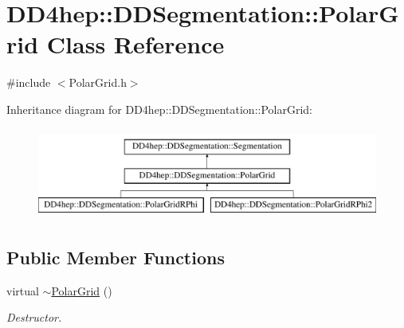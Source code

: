\hypertarget{class_d_d4hep_1_1_d_d_segmentation_1_1_polar_grid}{}\section{D\+D4hep\+:\+:D\+D\+Segmentation\+:\+:Polar\+Grid Class Reference}
\label{class_d_d4hep_1_1_d_d_segmentation_1_1_polar_grid}


{\ttfamily \#include $<$Polar\+Grid.\+h$>$}

Inheritance diagram for D\+D4hep\+:\+:D\+D\+Segmentation\+:\+:Polar\+Grid\+:\begin{figure}[H]
\begin{center}
\leavevmode
\includegraphics[height=3.000000cm]{class_d_d4hep_1_1_d_d_segmentation_1_1_polar_grid}
\end{center}
\end{figure}
\subsection*{Public Member Functions}
\begin{DoxyCompactItemize}
\item 
virtual \hyperlink{class_d_d4hep_1_1_d_d_segmentation_1_1_polar_grid_a894846ac7aeb9478a22e7bb0687178d8}{$\sim$\+Polar\+Grid} ()
\begin{DoxyCompactList}\small\item\em Destructor. \end{DoxyCompactList}\end{DoxyCompactItemize}
